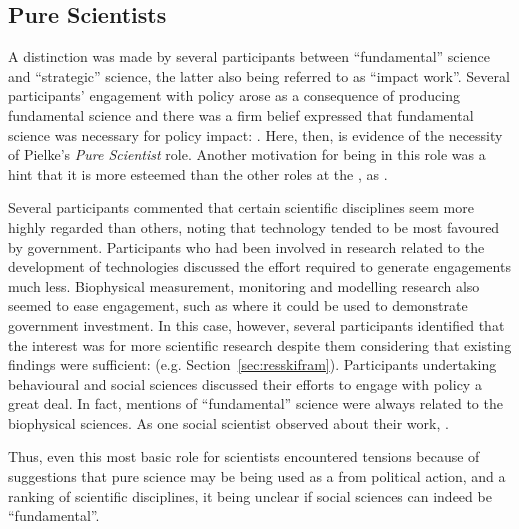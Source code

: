 \subsection{Pure Scientists}\label{sec:disscientist}
A distinction was made by several participants between ``fundamental'' science and ``strategic'' science, the latter also being referred to as ``impact work''. Several participants' engagement with policy arose as a consequence of producing fundamental science and there was a firm belief expressed that fundamental science was necessary for policy impact: . Here, then, is evidence of the necessity of Pielke's \emph{Pure Scientist} role. Another motivation for being in this role was a hint that it is more esteemed than the other roles at the \SPI, as . 

Several participants commented that certain scientific disciplines seem more highly regarded than others, noting that technology tended to be most favoured by government. Participants who had been involved in research related to the development of technologies discussed the effort required to generate engagements much less. Biophysical measurement, monitoring and modelling research also seemed to ease engagement, such as where it could be used to demonstrate government investment. In this case, however, several participants identified that the interest was for more scientific research despite them considering that existing findings were sufficient:  (e.g. Section~\ref{sec:resskifram}). Participants undertaking behavioural and social sciences discussed their efforts to engage with policy a great deal. In fact, mentions of ``fundamental'' science were always related to the biophysical sciences. As one social scientist observed about their work, . 

Thus, even this most basic \SPI{} role for scientists encountered tensions because of suggestions that pure science may be being used as a  from political action, and a ranking of scientific disciplines, it being unclear if social sciences can indeed be ``fundamental''.

